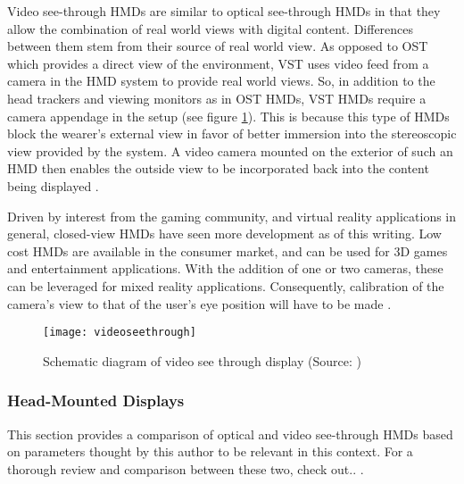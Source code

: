 Video see-through HMDs are similar to optical see-through HMDs in that they allow the combination of real world views with digital content. Differences between them stem from their source of real world view. As opposed to OST which provides a direct view of the environment, VST uses video feed from a camera in the HMD system to provide real world views. So, in addition to the head trackers and viewing monitors as in OST HMDs, VST HMDs require a camera appendage in the setup (see figure \ref{fig:videoseethrough}). This is because this type of HMDs block the wearer's external view in favor of better immersion into the stereoscopic view provided by the system. A video camera mounted on the exterior of such an HMD then enables the outside view to be incorporated back into the content being displayed . 

Driven by interest from the gaming community, and virtual reality applications in general, closed-view HMDs have seen more development as of this writing. Low cost HMDs are available in the consumer market, and can be used for 3D games and entertainment applications. With the addition of one or two cameras, these can be leveraged for mixed reality applications. Consequently, calibration of the camera's view to that of the user's eye position will have to be made .

\begin{figure}
	\centering
	\texttt{[image: videoseethrough]}
	\caption{Schematic diagram of video see through display (Source: \cite{azuma1997survey})}
	\label{fig:videoseethrough}
\end{figure}

\subsubsection{Head-Mounted Displays}
This section provides a comparison of optical and video see-through HMDs based on parameters thought by this author to be relevant in this context. For a thorough review and comparison between these two, check out.. .

